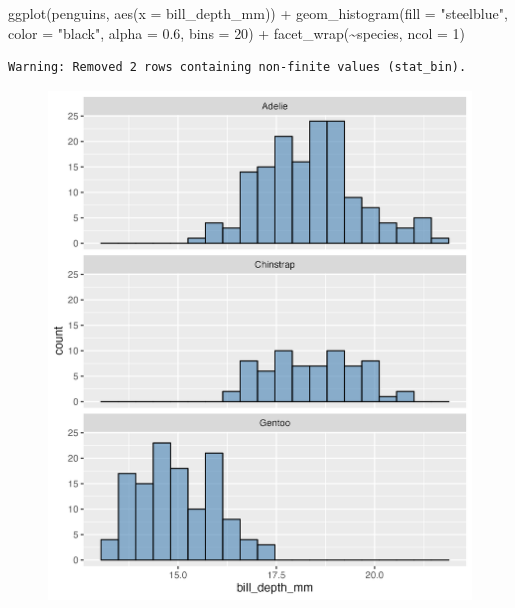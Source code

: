 \documentclass[
  letterpaper,
  DIV=11,
  numbers=noendperiod]{scrreprt}
\newenvironment{Shaded}{\begin{snugshade}}{\end{snugshade}}
\newcommand{\AttributeTok}[1]{\textcolor[rgb]{0.40,0.45,0.13}{#1}}
\newcommand{\DecValTok}[1]{\textcolor[rgb]{0.68,0.00,0.00}{#1}}
\newcommand{\FloatTok}[1]{\textcolor[rgb]{0.68,0.00,0.00}{#1}}
\newcommand{\FunctionTok}[1]{\textcolor[rgb]{0.28,0.35,0.67}{#1}}
\newcommand{\NormalTok}[1]{\textcolor[rgb]{0.00,0.23,0.31}{#1}}
\newcommand{\SpecialCharTok}[1]{\textcolor[rgb]{0.37,0.37,0.37}{#1}}
\newcommand{\StringTok}[1]{\textcolor[rgb]{0.13,0.47,0.30}{#1}}
\begin{document}
\begin{Shaded}
\begin{Highlighting}[]
\FunctionTok{ggplot}\NormalTok{(penguins, }\FunctionTok{aes}\NormalTok{(}\AttributeTok{x =}\NormalTok{ bill\_depth\_mm)) }\SpecialCharTok{+}
  \FunctionTok{geom\_histogram}\NormalTok{(}\AttributeTok{fill =} \StringTok{"steelblue"}\NormalTok{, }\AttributeTok{color =} \StringTok{"black"}\NormalTok{, }
                 \AttributeTok{alpha =} \FloatTok{0.6}\NormalTok{, }\AttributeTok{bins =} \DecValTok{20}\NormalTok{) }\SpecialCharTok{+}
  \FunctionTok{facet\_wrap}\NormalTok{(}\SpecialCharTok{\textasciitilde{}}\NormalTok{species, }\AttributeTok{ncol =} \DecValTok{1}\NormalTok{)}
\end{Highlighting}
\end{Shaded}

\begin{verbatim}
Warning: Removed 2 rows containing non-finite values (stat_bin).
\end{verbatim}

\begin{figure}[H]

{\centering \includegraphics{./03-visualization_files/figure-pdf/unnamed-chunk-68-1.png}

}

\end{figure}
\end{document}
